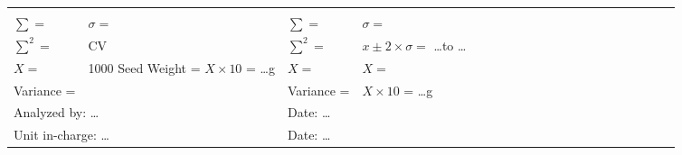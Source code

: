 \begin{tabular}{|llllllllllll|llllllllllllllll}
   &
   &
   &
   &
   &
   &
   &
   &
   &
   &
   &
   &
   &
   &
   &
   &
   \\ \cline{1-12}
\multicolumn{3}{|l|}{$\sum=$} &
  \multicolumn{3}{l|}{$\sigma = $} &
  \multicolumn{3}{l|}{$\sum=$} &
  \multicolumn{3}{l|}{$\sigma = $} &
   &
   &
   &
   &
   &
   &
   &
   &
   &
   &
   &
   &
   &
   &
   &
   \\ \cline{1-12}
\multicolumn{3}{|l|}{$\sum^2=$} &
  \multicolumn{3}{l|}{CV} &
  \multicolumn{3}{l|}{$\sum^2=$} &
  \multicolumn{3}{l|}{$x \pm 2\times \sigma = $ \ldots to \ldots} &
   &
   &
   &
   &
   &
   &
   &
   &
   &
   &
   &
   &
   &
   &
   &
   \\ \cline{1-12}
\multicolumn{3}{|l|}{$X=$} &
  \multicolumn{3}{l|}{\multirow{2}{*}{1000 Seed Weight = $X \times 10$ = \ldots g}} &
  \multicolumn{3}{l|}{$X=$} &
  \multicolumn{3}{l|}{$X =$} &
   &
   &
   &
   &
   &
   &
   &
   &
   &
   &
   &
   &
   &
   &
   &
   \\ \cline{1-3} \cline{7-12}
\multicolumn{3}{|l|}{Variance =} &
  \multicolumn{3}{l|}{} &
  \multicolumn{3}{l|}{Variance =} &
  \multicolumn{3}{l|}{$X \times 10$ = \ldots g} &
   &
   &
   &
   &
   &
   &
   &
   &
   &
   &
   &
   &
   &
   &
   &
   \\ \cline{1-12}
\multicolumn{6}{|l|}{Analyzed by: \ldots} &
  \multicolumn{6}{l|}{Date: \ldots} &
   &
   &
   &
   &
   &
   &
   &
   &
   &
   &
   &
   &
   &
   &
   &
   \\ \cline{1-12}
\multicolumn{6}{|l|}{Unit in-charge: \ldots} &
  \multicolumn{6}{l|}{Date: \ldots} &
   &
   &
   &
   &
   &
   &
   &
   &
   &
   &
   &
   &
   &
   &
   &
   \\ \cline{1-12}
\end{tabular}%
